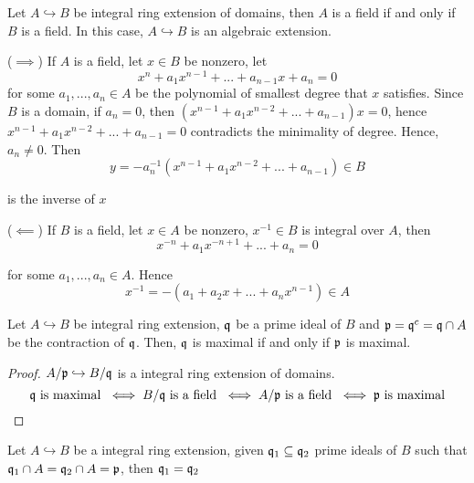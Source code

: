 \begin{proposition}
	Let $A \hookrightarrow B$ be integral ring extension of domains, then $A$ is a field if and only if $B$ is a field. In this case, $A \hookrightarrow B$ is an algebraic extension.
\end{proposition}

\begin{longproof}
	($\implies$) If $A$ is a field, let $x \in B$ be nonzero, let
	$$
		x^n + a_1 x^{n-1} + ... + a_{n-1} x + a_n = 0
	$$
	for some $a_1, ..., a_n \in A$ be the polynomial of smallest degree that $x$ satisfies. Since $B$ is a domain, if $a_n = 0$, then $(x^{n-1} + a_1 x^{n-2} + ... + a_{n-1}) x = 0$, hence $x^{n-1} + a_1 x^{n-2} + ... + a_{n-1} = 0$ contradicts the minimality of degree. Hence, $a_n \neq 0$. Then
	$$
		y = - a_n^{-1} (x^{n-1} + a_1 x^{n-2} + ... + a_{n-1}) \in B
	$$
	
	is the inverse of $x$
	
	($\impliedby$) If $B$ is a field, let $x \in A$ be nonzero, $x^{-1} \in B$ is integral over $A$, then
	$$
		x^{-n} + a_1 x^{-n+1} + ... + a_n = 0
	$$
	
	for some $a_1, ..., a_n \in A$. Hence
	$$
		x^{-1} = - (a_1 + a_2 x + ... + a_n x^{n-1}) \in A
	$$
\end{longproof}

\begin{corollary}
	Let $A \hookrightarrow B$ be integral ring extension, $\mathfrak{q}$ be a prime ideal of $B$ and $\mathfrak{p} = \mathfrak{q}^c = \mathfrak{q} \cap A$ be the contraction of $\mathfrak{q}$. Then, $\mathfrak{q}$ is maximal if and only if $\mathfrak{p}$ is maximal.
\end{corollary}

\begin{proof}
	$A / \mathfrak{p} \hookrightarrow B / \mathfrak{q}$ is a integral ring extension of domains.
	$$
		\mathfrak{q} \text{ is maximal } \iff B / \mathfrak{q} \text{ is a field } \iff A / \mathfrak{p} \text{ is a field } \iff \mathfrak{p} \text{ is maximal}
	$$
\end{proof}

\begin{proposition}
	Let $A \hookrightarrow B$ be a integral ring extension, given $\mathfrak{q}_1 \subseteq \mathfrak{q}_2$ prime ideals of $B$ such that $\mathfrak{q}_1 \cap A = \mathfrak{q}_2 \cap A = \mathfrak{p}$, then $\mathfrak{q}_1 = \mathfrak{q}_2$
\end{proposition}

